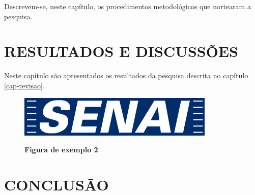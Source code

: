 \documentclass[
	12pt,				%
	openright,			%
	oneside,			%
	a4paper,			%
	chapter=TITLE,		%
	section=TITLE,		%
	brazil				%
	]{abntex2}
\begin{document}
Descrevem-se, neste capítulo, os procedimentos metodológicos que nortearam a pesquisa.

\chapter{RESULTADOS E DISCUSSÕES}

Neste capítulo são apresentados os resultados da pesquisa descrita no capítulo \ref{cap-revisao}.

\begin{figure}[htb]
  \begin{center}
    \caption{\textbf{Figura de exemplo 2}}\label{fig-exemplo1}
    \includegraphics [scale=0.6]{logo-senai.jpg}
    \label{fig-exemplo1}
  \end{center}
\end{figure}
\chapter{CONCLUSÃO}



\label{nropaginas}


\printindex
\end{document}

